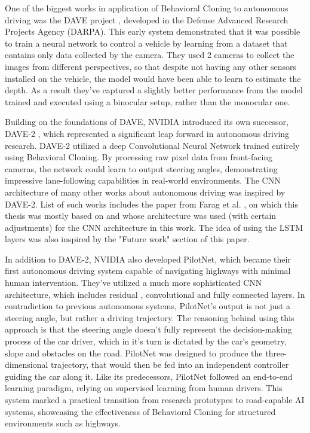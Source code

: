 One of the biggest works in application of Behavioral Cloning to autonomous driving was the DAVE project \autocite{muller2004autonomous}, developed in the Defense Advanced Research Projects Agency (DARPA). This early system demonstrated that it was possible to train a neural network to control a vehicle by learning from a dataset that contains only data collected by the camera. They used 2 cameras to collect the images from different perspectives, so that despite not having any other sensors installed on the vehicle, the model would have been able to learn to estimate the depth. As a result they've captured a slightly better performance from the model trained and executed using a binocular setup, rather than the monocular one.

Building on the foundations of DAVE, NVIDIA introduced its own successor, DAVE-2 \autocite{bojarski2016endendlearningselfdriving}, which represented a significant leap forward in autonomous driving research. DAVE-2 utilized a deep Convolutional Neural Network trained entirely using Behavioral Cloning. By processing raw pixel data from front-facing cameras, the network could learn to output steering angles, demonstrating impressive lane-following capabilities in real-world environments. The CNN architecture of many other works about autonomous driving was inspired by DAVE-2. List of such works includes the paper from Farag et al. \autocite{8855753}, on which this thesis was mostly based on and whose architecture was used (with certain adjustments) for the CNN architecture in this work. The idea of using the LSTM layers \autocite{6795963} was also inspired by the "Future work" section of this paper.

In addition to DAVE-2, NVIDIA also developed PilotNet, which became their first autonomous driving system capable of navigating highways with minimal human intervention. They've utilized a much more sophisticated CNN architecture, which includes residual \autocite{he2015deepresiduallearningimage}, convolutional and fully connected layers. In contradiction to previous autonomous systems, PilotNet's output is not just a steering angle, but rather a driving trajectory. The reasoning behind using this approach is that the steering angle doesn't fully represent the decision-making process of the car driver, which in it's turn is dictated by the car's geometry, slope and obstacles on the road. PilotNet was designed to produce the three-dimensional trajectory, that would then be fed into an independent controller guiding the car along it. Like its predecessors, PilotNet followed an end-to-end learning paradigm, relying on supervised learning from human drivers. This system marked a practical transition from research prototypes to road-capable AI systems, showcasing the effectiveness of Behavioral Cloning for structured environments such as highways.

